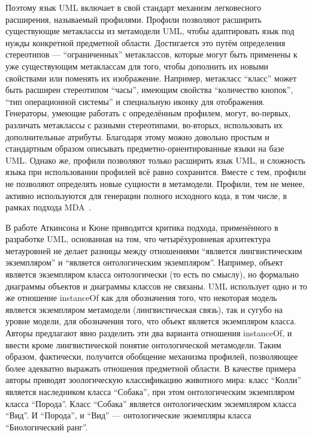 Поэтому язык UML включает в свой стандарт механизм легковесного расширения, называемый 
профилями. Профили позволяют расширить существующие метаклассы из метамодели UML, 
чтобы адаптировать язык под нужды конкретной предметной области. Достигается это путём 
определения стереотипов --- "`ограниченных"' метаклассов, которые могут быть применены 
к уже существующим метаклассам для того, чтобы дополнить их новыми свойствами или 
поменять их изображение. Например, метакласс "`класс"' может быть расширен стереотипом 
"`часы"', имеющим свойства "`количество кнопок"', "`тип операционной системы"' и специальную 
иконку для отображения. Генераторы, умеющие работать с определённым профилем, могут, 
во-первых, различать метаклассы с разными стереотипами, во-вторых, использовать их 
дополнительные атрибуты. Благодаря этому можно довольно простым и стандартным образом 
описывать предметно-ориентированные языки на базе UML. Однако же, профили позволяют 
только расширить язык UML, и сложность языка при использовании профилей всё равно 
сохранится. Вместе с тем, профили не позволяют определять новые сущности в метамодели. 
Профили, тем не менее, активно используются для генерации полного исходного кода, 
в том числе, в рамках подхода MDA~\cite{swithinbank2005patterns}.

В работе Аткинсона и Кюне \cite{atkinson2003model} приводится критика подхода, применённого в разработке UML, 
основанная на том, что четырёхуровневая архитектура метауровней не делает разницы между отношениями 
"`является лингвистическим экземпляром"' и "`является онтологическим экземпляром"'. 
Например, объект является экземпляром класса онтологически (то есть по смыслу), но 
формально диаграммы объектов и диаграммы классов не связаны. UML использует одно и 
то же отношение instanceOf как для обозначения того, что некоторая модель является 
экземпляром метамодели (лингвистическая связь), так и сугубо на уровне модели, для 
обозначения того, что объект является экземпляром класса. Авторы предлагают явно разделить 
эти два варианта отношения instanceOf, и ввести кроме лингвистической понятие онтологической 
метамодели. Таким образом, фактически, получится обобщение механизма профилей, позволяющее
более адекватно выражать отношения предметной области. В качестве примера авторы приводят 
зоологическую классификацию животного мира: класс "`Колли"' является наследником класса 
"`Собака"', при этом онтологическим экземпляром класса "`Порода"'. Класс "`Собака"' 
является онтологическим экземпляром класса "`Вид"'. И "`Порода"', и "`Вид"' --- онтологические 
экземпляры класса "`Биологический ранг"'.

